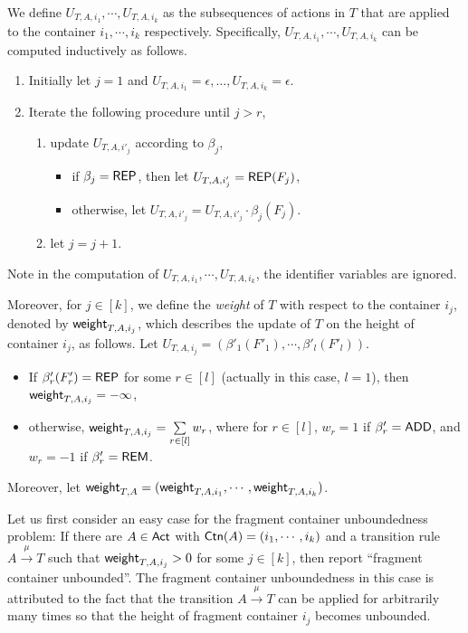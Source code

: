 We define $U_{T, A, i_1}, \cdots, U_{T, A, i_k}$ as the subsequences of actions in $T$ that are applied to the container $i_1, \cdots, i_k$ respectively.
Specifically, $U_{T, A, i_1}, \cdots, U_{T, A, i_k}$ can be computed inductively as follows.
\begin{enumerate}
    \item Initially let $j = 1$ and $U_{T, A, i_1} = \epsilon,\dots,U_{T, A, i_k} = \epsilon$.
    \item Iterate the following procedure until $j > r$,
        \begin{enumerate}
            \item update $U_{T, A, i'_j}$ according to $\beta_j$, 
            \begin{itemize}
                \item if $\beta_j = \mathsf{REP}$, then let $U_{T, A, i'_j} = \mathsf{REP}(F_j)$,
                \item otherwise, let $U_{T, A, i'_j} = U_{T, A, i'_j} \cdot \beta_j(F_j)$.
            \end{itemize}
            \item let $j = j+1$.
        \end{enumerate}
\end{enumerate}
Note in the computation of $U_{T, A, i_1}, \cdots, U_{T, A, i_k}$, the identifier variables are ignored. 

%
Moreover, for $j \in [k]$, we define the \emph{weight} of $T$ with respect to the container $i_j$, denoted by ${\mathsf{weight} }_{T, A, i_j}$, which describes the update of $T$ on the height of container $i_j$, as follows. Let $U_{T, A, i_j} = (\beta'_1(F'_1), \cdots, \beta'_l(F'_l))$. 
\begin{itemize}
\item If $\beta'_{r}(F'_r) = \mathsf{REP}$ for some $r \in [l]$ (actually in this case, $l = 1$), then ${\mathsf{weight} }_{T, A, i_j} = -\infty$, 
%
\item otherwise, ${\mathsf{weight} }_{T, A, i_j} = \sum \limits_{r \in [l]} w_r$, where for $r \in [l]$, $w_r = 1$ if $\beta'_r = \mathsf{ADD}$, and $w_r = -1$ if $\beta'_r = \mathsf{REM}$.
\end{itemize} 
Moreover, let ${\mathsf{weight} }_{T, A} = ({\mathsf{weight} }_{T, A, i_1}, \cdots, {\mathsf{weight} }_{T, A, i_k})$. 

Let us first consider an easy case for the fragment container unboundedness problem: If there are $A \in {\sf Act}$ with ${\sf Ctn}(A) = (i_1, \cdots, i_k)$ and a transition rule $A \xrightarrow{\mu} T$ such that ${\mathsf{weight} }_{T, A, i_j} > 0$ for some $j \in [k]$, then report ``fragment container unbounded''. The fragment container unboundedness in this case is attributed to the fact that the transition $A \xrightarrow{\mu} T$ can be applied for arbitrarily many times so that the height of fragment container $i_j$ becomes unbounded.

